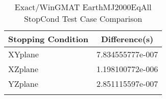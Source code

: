 \begin{table}[htbp!]
\centering
\caption{ Exact/WinGMAT EarthMJ2000EqAll StopCond Test Case Comparison}
      \begin{tabular}{lc}
      \hline\hline
          Stopping Condition & Difference(s) \\
         \hline
         XYplane & 7.834555777e-007 \\
         XZplane & 1.198100772e-006 \\
         YZplane & 2.851115597e-007 \\
      \hline\hline
      \label{Table: Exact-WinGMAT EarthMJ2000EqAll StopCond Table} 
\end{tabular}
\end{table}
